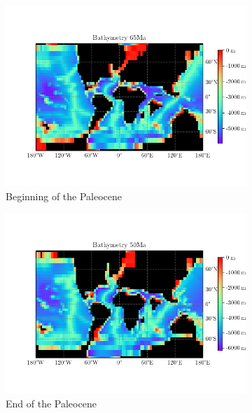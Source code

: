 \documentclass[a4paper]{article}
\begin{document}
\begin{multicols}{2}
\begin{figure}[H]
	
	\centering
	\begin{subfigure}[b]{\linewidth}
		\centering
		\includegraphics[width=\linewidth]{bathymetry/baath_65.png}
		\caption{Beginning of the Paleocene}
	\end{subfigure}
\begin{subfigure}[b]{\linewidth}
	\centering
	\includegraphics[width=\linewidth]{bathymetry/baath_50.png}
	\caption{End of the Paleocene}
\end{subfigure}
	\caption{}
	\label{fig:paleocene_bath}
\end{figure}




\end{multicols}
\end{document}
